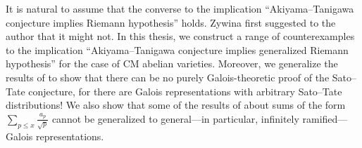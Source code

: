 It is natural to assume that the converse to the implication 
``Akiyama--Tanigawa conjecture implies Riemann hypothesis'' holds. Zywina 
first suggested to the author that it might not. In this thesis, we construct a 
range of counterexamples to the implication ``Akiyama--Tanigawa conjecture implies 
generalized Riemann hypothesis'' for the case of CM abelian varieties. 
Moreover, we generalize the results of \cite{pande-2011} to show that there can 
be no purely Galois-theoretic proof of the Sato--Tate conjecture, for there are 
Galois representations with arbitrary Sato--Tate distributions! We also show 
that some of the results of \cite{sarnak-2007} about sums of the form 
$\sum_{p\leqslant x} \frac{a_p}{\sqrt p}$ cannot be generalized to 
general---in particular, infinitely ramified---Galois representations. 

